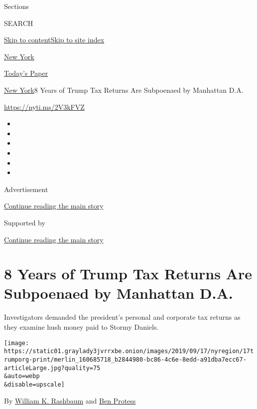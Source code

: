 Sections

SEARCH

\protect\hyperlink{site-content}{Skip to
content}\protect\hyperlink{site-index}{Skip to site index}

\href{https://www.nytimes3xbfgragh.onion/section/nyregion}{New York}

\href{https://myaccount.nytimes3xbfgragh.onion/auth/login?response_type=cookie\&client_id=vi}{}

\href{https://www.nytimes3xbfgragh.onion/section/todayspaper}{Today's
Paper}

\href{/section/nyregion}{New York}\textbar{}8 Years of Trump Tax Returns
Are Subpoenaed by Manhattan D.A.

\url{https://nyti.ms/2V3kFVZ}

\begin{itemize}
\item
\item
\item
\item
\item
\item
\end{itemize}

Advertisement

\protect\hyperlink{after-top}{Continue reading the main story}

Supported by

\protect\hyperlink{after-sponsor}{Continue reading the main story}

\hypertarget{8-years-of-trump-tax-returns-are-subpoenaed-by-manhattan-da}{%
\section{8 Years of Trump Tax Returns Are Subpoenaed by Manhattan
D.A.}\label{8-years-of-trump-tax-returns-are-subpoenaed-by-manhattan-da}}

Investigators demanded the president's personal and corporate tax
returns as they examine hush money paid to Stormy Daniels.

\texttt{[image: https://static01.graylady3jvrrxbe.onion/images/2019/09/17/nyregion/17trumporg-print/merlin\_160685718\_b2844980-bc86-4c6e-8edd-a91dba7ecc67-articleLarge.jpg?quality=75\\\&auto=webp\\\&disable=upscale]}

By
\href{https://www.nytimes3xbfgragh.onion/by/william-k-rashbaum}{William
K. Rashbaum} and
\href{https://www.nytimes3xbfgragh.onion/by/ben-protess}{Ben Protess}

